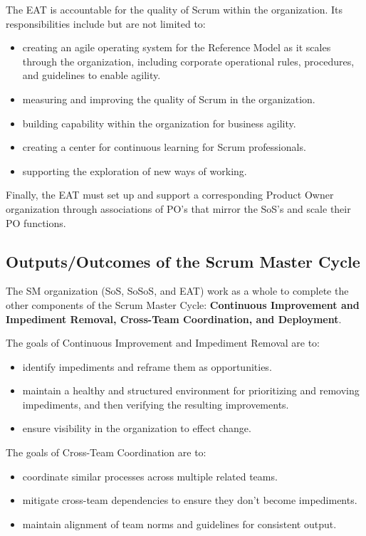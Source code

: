 \documentclass[12pt,a4paper,parskip=full]{scrartcl}
\begin{document}
The EAT is accountable for the quality of Scrum within the organization.
Its responsibilities include but are not limited to:
\begin{itemize}
\item creating an agile operating system for the Reference Model as it
scales through the organization, including corporate operational rules,
procedures, and guidelines to enable agility.
\item measuring and improving the quality of Scrum in the organization.
\item building capability within the organization for business agility.
\item creating a center for continuous learning for Scrum professionals.
\item supporting the exploration of new ways of working.
\end{itemize}
Finally, the EAT must set up and support a corresponding Product Owner
organization through associations of PO's that mirror the SoS's and scale
their PO functions.

\subsection{Outputs/Outcomes of the Scrum Master Cycle}
The SM organization (SoS, SoSoS, and EAT) work as a whole to complete the
other components of the Scrum Master Cycle: \textbf{Continuous Improvement
and Impediment Removal, Cross-Team Coordination, and Deployment}.

The goals of Continuous Improvement and Impediment Removal are to:
\begin{itemize}
\item identify impediments and reframe them as opportunities.
\item maintain a healthy and structured environment for prioritizing and
removing impediments, and then verifying the resulting improvements.
\item ensure visibility in the organization to effect change.
\end{itemize}
The goals of Cross-Team Coordination are to:
\begin{itemize}
\item coordinate similar processes across multiple related teams.
\item mitigate cross-team dependencies to ensure they don't become
impediments.
\item maintain alignment of team norms and guidelines for consistent output.
\end{itemize}
\end{document}
